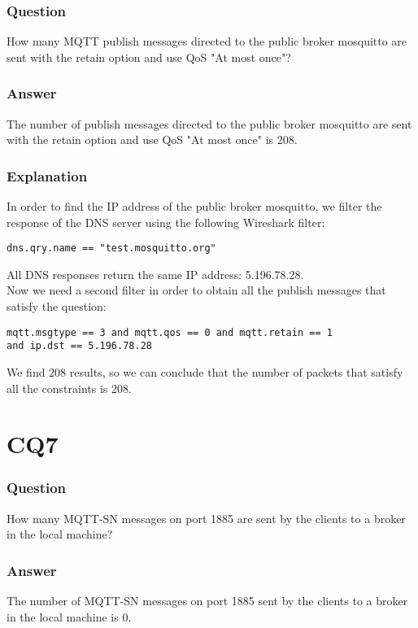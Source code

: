 \subsubsection{Question}
How many MQTT publish messages directed to the public broker mosquitto are sent with the retain option and use QoS "At most once"?

\subsubsection{Answer}
The number of publish messages directed to the public broker mosquitto are sent with the retain option and use QoS "At most once" is 208.

\subsubsection{Explanation}
In order to find the IP address of the public broker mosquitto, we filter the response of the DNS server using the following Wireshark filter:
\begin{verbatim}
dns.qry.name == "test.mosquitto.org"
\end{verbatim}
All DNS responses return the same IP address: 5.196.78.28.\\
Now we need a second filter in order to obtain all the publish messages that satisfy the question:
\begin{verbatim}
mqtt.msgtype == 3 and mqtt.qos == 0 and mqtt.retain == 1 
and ip.dst == 5.196.78.28
\end{verbatim}
We find 208 results, so we can conclude that the number of packets that satisfy all the constraints is 208.

\section{CQ7}
\subsubsection{Question}
How many MQTT-SN messages on port 1885 are sent by the clients to a broker in the local machine?

\subsubsection{Answer}
The number of MQTT-SN messages on port 1885 sent by the clients to a broker in the local machine is 0.

